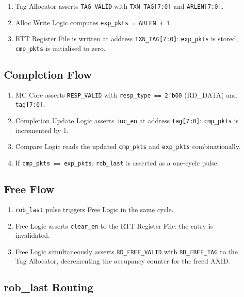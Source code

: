 \begin{enumerate}
  \item Tag Allocator asserts \texttt{TAG\_VALID} with \texttt{TXN\_TAG[7:0]}
        and \texttt{ARLEN[7:0]}.
  \item Alloc Write Logic computes \texttt{exp\_pkts = ARLEN + 1}.
  \item RTT Register File is written at address \texttt{TXN\_TAG[7:0]}:
        \texttt{exp\_pkts} is stored, \texttt{cmp\_pkts} is initialised
        to zero.
\end{enumerate}

\subsection{Completion Flow}

\begin{enumerate}
  \item MC Core asserts \texttt{RESP\_VALID} with \texttt{resp\_type == 2'b00}
        (RD\_DATA) and \texttt{tag[7:0]}.
  \item Completion Update Logic asserts \texttt{inc\_en} at address
        \texttt{tag[7:0]}: \texttt{cmp\_pkts} is incremented by 1.
  \item Compare Logic reads the updated \texttt{cmp\_pkts} and
        \texttt{exp\_pkts} combinationally.
  \item If \texttt{cmp\_pkts == exp\_pkts}: \texttt{rob\_last} is
        asserted as a one-cycle pulse.
\end{enumerate}

\subsection{Free Flow}

\begin{enumerate}
  \item \texttt{rob\_last} pulse triggers Free Logic in the same cycle.
  \item Free Logic asserts \texttt{clear\_en} to the RTT Register File:
        the entry is invalidated.
  \item Free Logic simultaneously asserts \texttt{RD\_FREE\_VALID} with
        \texttt{RD\_FREE\_TAG} to the Tag Allocator, decrementing the
        occupancy counter for the freed AXID.
\end{enumerate}

\subsection{rob\_last Routing}


